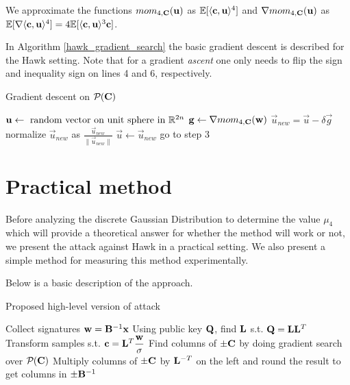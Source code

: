 We approximate the functions $mom_{4, \mathbf{C}}(\mathbf{u})$ as $\mathbb{E} [\langle \mathbf{c}, \mathbf{u} \rangle ^4]$ and $\nabla mom_{4,\mathbf{C}}(\mathbf{u})$ as $\mathbb{E} [\nabla \langle \mathbf{c}, \mathbf{u} \rangle ^4] = 4 \mathbb{E} [\langle \mathbf{c}, \mathbf{u} \rangle ^3 \mathbf{c}]$.

In Algorithm \ref{hawk_gradient_search} the basic gradient descent is described for the Hawk setting. Note that 
for a gradient \textit{ascent} one only needs to flip the sign and inequality sign on lines 4 and 6, respectively.
\begin{algorithm}[H]
    \caption{Gradient descent on $\mathcal{P}_{}(\mathbf{C})$}\label{hawk_gradient_search}
\begin{algorithmic}[1]
    \State $\mathbf{u} \gets \text{ random vector on unit sphere in } \mathbb{R}^{2n}$
    \Loop
    \State $\mathbf{g} \gets \nabla mom_{4, \mathbf{C}}(\mathbf{w})$
    \State $\vec{u}_{new} = \vec{u} - \delta \vec{g}$
    \State normalize $\vec{u}_{new}$ as $\frac{\vec{u}_{new}}{\lVert \vec{u}_{new} \rVert}$
    \State {}
    \Else 
    \State $\vec{u} \gets \vec{u}_{new}$
    \State go to step 3
    \EndIf
    \EndLoop
\end{algorithmic}
\end{algorithm}

\section{Practical method}

Before analyzing the discrete Gaussian Distribution to determine the value $\mu_4$ which will provide a theoretical answer for whether the method will work or not, we present the attack against Hawk in a practical setting.
We also present a simple method for measuring this method experimentally.

Below is a basic description of the approach.
\begin{algorithm}[H]
\caption{Proposed high-level version of attack}
\begin{algorithmic}[1]
    \State Collect signatures $\mathbf{w} = \mathbf{B}^{-1} \mathbf{x}$
    \State Using public key $\mathbf{Q}$, find $\mathbf{L}$ s.t. $\mathbf{Q} = \mathbf{L} \mathbf{L}^T$
    \State Transform samples s.t. $\vec{c} = \mat{L}^T \mathlarger{\frac{\vec{w}}{\sigma}}$
    \State Find columns of $\pm \mathbf{C}$ by doing gradient search over $\mathcal{P}_{}(\mathbf{C})$
    \State Multiply columns of $\pm \mathbf{C}$ by $\mathbf{L}^{-T}$ on the left and round the result to get columns in $\pm \mathbf{B}^{-1}$
\end{algorithmic}
\end{algorithm}

